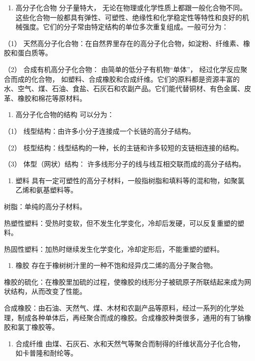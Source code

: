 \begin{enumerate}
\item
  高分子化合物 分子量特大，
  无论在物理或化学性质上都跟一般化合物不同。这些化合物一般都具有弹性、可塑性、绝缘性和化学稳定性等特性和良好的机械强度。它们的分子常由特定结构的单位多次重复组成。一般可分为：
\end{enumerate}

（1）
天然高分子化合物：在自然界里存在的高分子化合物，如淀粉、纤维素、橡胶和蛋白质等。

（2） 合成有机高分子化合物： 由简单的低分子有机物``单体''，
经过化学反应聚合而成的化合物，
如塑料、合成橡胶和合成纤维。它们的原料都是资源丰富的水、空气、煤、石油、食盐、石灰石和农副产品。它们能代替铜材、有色金属、皮革、橡胶和棉花等原材料。

\begin{enumerate}[start=2]
\item
  高分子化合物的结构 可以分为：
\end{enumerate}

（1） 线型结构：由许多小分子连接成一个长链的高分子结构。

（2） 枝型结构：线型结构的一种，长的主链和许多较短的支链相连接的结构。

（3） 体型（网状）结构： 许多线形分子的线与线互相交联而成的高分子结构。

\begin{enumerate}[start=3]
\item
  塑料
  具有一定可塑性的高分子材料，一般指树脂和填料等的混和物，如聚氯乙烯和氨基塑料等。
\end{enumerate}

树脂：单纯的高分子材料。

热塑性塑料：受热时变软，但不发生化学变化，冷却后发硬，可以反复重塑的塑料。

热固性塑料：加热时继续发生化学变化，冷却定形后，不能重塑的塑料。

\begin{enumerate}[start=4]
\item
  橡胶 存在于橡树树汁里的一种不饱和烃异戊二烯的高分子聚合物。
\end{enumerate}

橡胶的硫化：在橡胶里加硫的过程，使橡胶的线形分子被硫原子所联结起来成为网状结构，从而改变了性能。

合成橡胶：由石油、天然气、煤、木材和农副产品等原料，经过一系列的化学处理，制成各种单体后，再经聚合而成的橡胶。合成橡胶种类很多，通用的有丁钠橡胶和氯丁橡胶等。

\begin{enumerate}[start=5]
\item
  合成纤维
  由煤、石灰石、水和天然气等聚合而制得的纤维状高分子化合物，如卡普隆和耐纶等。
\end{enumerate}

